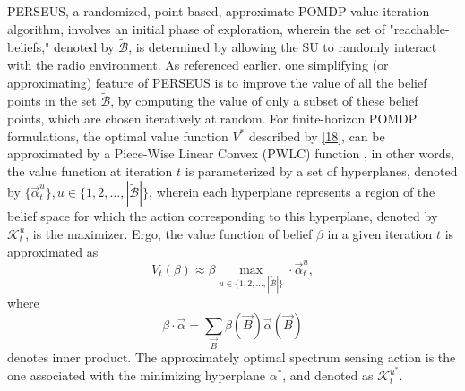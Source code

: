 \documentclass[12pt, draftcls, onecolumn]{IEEEtran}
\begin{document}
PERSEUS, a randomized, point-based, approximate POMDP value iteration algorithm, involves an initial phase of exploration, wherein the set of "reachable-beliefs," denoted by $\tilde{\mathcal{B}}$, is determined by allowing the SU to randomly interact with the radio environment. As referenced earlier, one simplifying (or approximating) feature of PERSEUS is to improve the value of all the belief points in the set $\tilde{\mathcal{B}}$, by computing the value of only a subset of these belief points, which are chosen iteratively at random. For finite-horizon POMDP formulations, the optimal value function $V^{*}$ described by \eqref{18}, can be approximated by a Piece-Wise Linear Convex (PWLC) function \cite{WCL:13}, in other words, the value function at iteration $t$ is parameterized by a set of hyperplanes, denoted by $\{\vec{\alpha}_{t}^{u}\},u{\in}\{1,2,\dots,|\tilde{\mathcal{B}}|\}$, wherein each hyperplane represents a region of the belief space for which the action corresponding to this hyperplane, denoted by $\mathcal{K}_{t}^{u}$, is the maximizer. Ergo, the value function of belief $\beta$ in a given iteration $t$ is approximated as
\begin{equation}\label{22}
    V_{t}(\beta) \approx \beta \max_{u \in \{1,2,\dots,|\tilde{\mathcal{B}}|\}} \cdot \vec{\alpha}_{t}^{u},
\end{equation}
where
\begin{equation}\label{24}
    \beta \cdot \vec{\alpha}=\sum_{\vec{B}}\beta(\vec{B})\vec{\alpha}(\vec{B})
\end{equation}
denotes inner product.
The approximately optimal spectrum sensing action
is the one associated with the minimizing hyperplane $\alpha^*$,
and denoted as $\mathcal{K}_{t}^{u^{*}}$.
\end{document}
